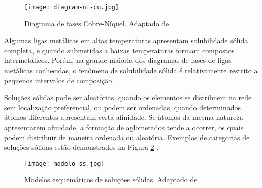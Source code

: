 \pagebreak

\begin{figure}[ht]
    \centering
    \texttt{[image: diagram-ni-cu.jpg]} 
    \caption{Diagrama de fases Cobre-Níquel. Adaptado de \cite{callister2011materials} }
    \label{fig:diagrama-ni-cu}
\end{figure}


Algumas ligas metálicas em altas temperaturas apresentam solubilidade sólida completa, e quando submetidas a baixas temperaturas formam compostos intermetálicos. Porém, na grande maioria dos diagramas de fases de ligas metálicas conhecidas, o fenômeno de solubilidade sólida é relativamente restrito a pequenos intervalos de composição \cite{massalski1996structure}.

Soluções sólidas pode ser aleatórias, quando os elementos se distribuem na rede sem localização preferencial, ou podem ser ordenadas, quando determinados átomos diferentes apresentam certa afinidade. Se átomos da mesma natureza apresentarem afinidade, a formação de aglomerados tende a ocorrer, os quais podem distribuir de maneira ordenada ou aleatória\cite{massalski1996structure}. Exemplos de categorias de soluções sólidas estão demonstrados na Figura \ref{fig:modelo-ss} .

\begin{figure}[ht]
    \centering
    \texttt{[image: modelo-ss.jpg]} 
    \caption{ Modelos esquemáticos de soluções sólidas. Adaptado de \cite{massalski1996structure}}
    \label{fig:modelo-ss}
\end{figure}
